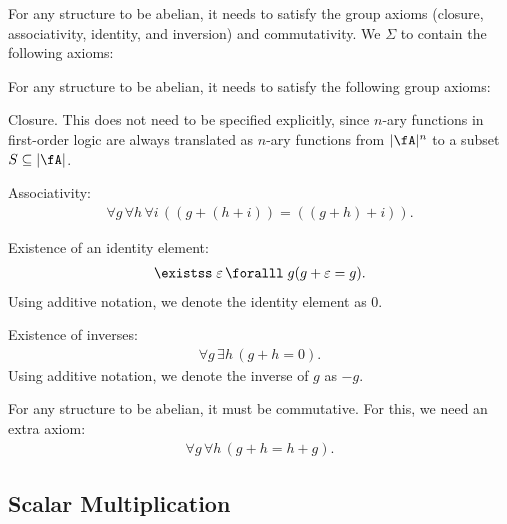 For any structure to be abelian, it needs to satisfy the group axioms
(closure, associativity, identity, and inversion) and commutativity.
We $\Sigma$ to contain the following axioms:

For any structure to be abelian, it needs to satisfy the following
group axioms:
\begin{enumroman}
  \item Closure. This does not need to be specified explicitly,
    since $n$-ary functions in first-order logic are always
    translated as $n$-ary functions from $\abs{\fA}^n$
    to a subset $S \subseteq \abs{\fA}$.
  \item Associativity:
    \begin{align}
      \forall g\, \forall h\, \forall i\, ( (g + (h + i)) = ((g + h) + i) ).
    \end{align}
  \item Existence of an identity element:
    \begin{align} \exists \eps\, \forall g ( g + \eps = g). \end{align}
    Using additive notation, we denote the identity element as $0$.
  \item Existence of inverses:
    \begin{align} \forall g\, \exists h\, (g + h = 0). \end{align}
    Using additive notation, we denote the inverse of $g$ as $-g$.

  \item For any structure to be abelian, it must be commutative.
    For this, we need an extra axiom:
    \begin{align} \forall g\, \forall h\, (g + h = h + g). \end{align}
\end{enumroman}

\subsection{Scalar Multiplication}~\label{sec:scalar-multiplication}

